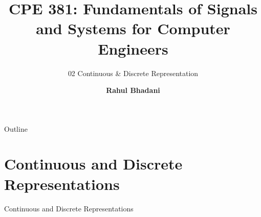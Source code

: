 \documentclass[aspectratio=169,xcolor=dvipsnames,svgnames,x11names,fleqn]{beamer}
\title[CPE 381: Signals and Systems]{CPE 381: Fundamentals of Signals and Systems for Computer Engineers} %
\subtitle{02 Continuous \& Discrete Representation}
\author[Rahul Bhadani] {{\Large \textbf{Rahul Bhadani}}}
\institute[UAH] %
{
    Electrical \& Computer Engineering,  The University of Alabama in Huntsville
}
\date
\begin{document}
\begin{frame}
  \titlepage
\end{frame}

\begin{frame}{Outline}
   \tableofcontents
\end{frame}



\section{Continuous and Discrete Representations}

\begin{frame}{}
    \begin{center}
    \Huge \bf \color{DarkBlue}
    \faFire
    
Continuous and Discrete Representations
\end{center}
\end{frame}
\end{document}
